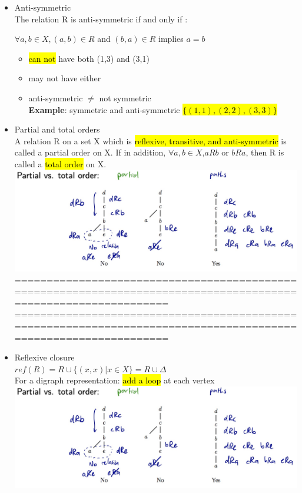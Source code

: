 \documentclass{article}
\begin{document}
\begin{itemize}
\item Anti-symmetric\\
The relation R is anti-symmetric if and only if :
\begin{center}
$\forall a,b \in X,  (a,b) \in R$ and $(b,a) \in R$ implies $a=b$\\
\end{center}

\begin{itemize}
\item \hl{can not} have both (1,3) and (3,1)
\item may not have either
\item anti-symmetric $\neq$ not symmetric\\
\textbf{Example}: symmetric and anti-symmetric
\hl{$\{(1,1),(2,2),(3,3)\}$}
\end{itemize}

\item Partial and total orders\\
A relation R on a set X which is \hl{reflexive, transitive, and anti-symmetric} is
called a partial order on X.
If in addition, $\forall a,b \in X$,$aRb$ or $bRa$, then R is called a \hl{total order} on X.\\
\includegraphics[width=0.8\linewidth]{graph/13.jpg} \\%


================================================================================================================
\newpage
================================================================================================================\\

\item Reflexive closure\\
$ref(R) = R \cup \{(x,x) | x \in X\}  =R \cup \Delta$\\
For a digraph representation: \hl{add a loop} at each vertex\\
\includegraphics[width=1.2\linewidth]{graph/13.jpg} \\%


\end{itemize}
\end{document}
